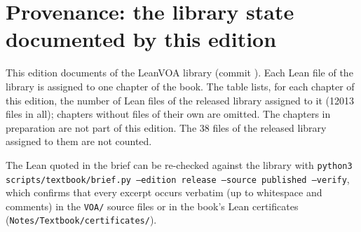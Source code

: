 \chapter{Provenance: the library state documented by this edition}\label{ch:provenance}
This edition documents \bookrelease{} of the LeanVOA library (commit \texttt{\bookcommit}). Each Lean
file of the library is assigned to one chapter of the book. The table lists, for each chapter of this
edition, the number of Lean files of the released library assigned to it (12013 files in all); chapters
without files of their own are omitted. The chapters in preparation are not part of this edition. The 38 files of the released library assigned to them are not counted.

The Lean quoted in the brief can be re-checked against the library with
\texttt{python3 scripts/textbook/brief.py --edition release --source published --verify}, which
confirms that every excerpt occurs verbatim (up to whitespace and comments) in the \texttt{VOA/} source
files or in the book's Lean certificates (\texttt{Notes/Textbook/certificates/}).
